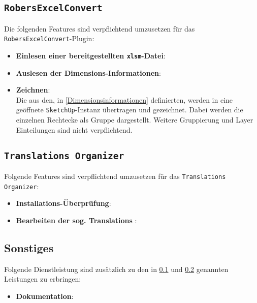 \documentclass[a4paper,12pt]{article}
\newcommand{\robersexcelconvert}{\texttt{RobersExcelConvert}\xspace}
\newcommand{\assisttool}{\texttt{Translations Organizer}}
\newcommand{\sketchup}{\texttt{SketchUp}\xspace}
\begin{document}
		\subsection{\robersexcelconvert} \label{Pflichten-Nehmer-main}
			Die folgenden Features sind verpflichtend umzusetzen für das \robersexcelconvert-Plugin:
			\begin{itemize}
				\item \textbf{Einlesen einer bereitgestellten \texttt{xlsm}-Datei}: %
				\item \textbf{Auslesen der Dimensions-Informationen}: \label{Dimensionsinformationen}
				\item \textbf{Zeichnen}: \label{zeichnen}\\
					Die aus den, in \ref{Dimensionsinformationen} definierten, werden in eine geöffnete \sketchup-Instanz übertragen und gezeichnet. Dabei werden die einzelnen Rechtecke als Gruppe dargestellt. Weitere Gruppierung und Layer Einteilungen sind nicht verpflichtend.
			\end{itemize}
		\subsection{\assisttool} \label{Pflichten-Nehmer-assist}
			Folgende Features sind verpflichtend umzusetzen für das \assisttool:
			\begin{itemize}
				\item \textbf{Installations-Überprüfung}: \label{installations ueberpruefung}
				\item \textbf{Bearbeiten der sog. \glqq Translations \grqq}: \label{translations}
			\end{itemize}
		\subsection{Sonstiges} \label{Pflichten-sonstiges}
			Folgende Dienstleistung sind zusätzlich zu den in \ref{Pflichten-Nehmer-main} und \ref{Pflichten-Nehmer-assist} genannten Leistungen zu erbringen:
			\begin{itemize}
				\item \textbf{Dokumentation}:
			\end{itemize}
\end{document}
